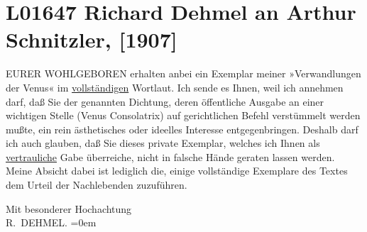 

\section[Richard Dehmel an Arthur Schnitzler, {[}1907{]}]{L01647 Richard Dehmel an Arthur Schnitzler, {[}1907{]}}
\nopagebreak{}
\rehead{ }\normalsize\beginnumbering{}
\toendnotes[C]{\smallbreak\pagebreak[2]}
\toendnotes[C]{\smallbreak}
\pstart\center{}{\pb}EURER WOHLGEBOREN\pend\vspace{0.5em}
\pstart
           erhalten anbei ein Exemplar meiner »Verwandlungen der
                  Venus« im \uline{vollständigen} Wortlaut. Ich sende
               es Ihnen, weil ich annehmen darf, daß Sie der genannten Dichtung, deren öffentliche
               Ausgabe an einer wichtigen Stelle (Venus Consolatrix) auf gerichtlichen Befehl
               verstümmelt werden mußte, ein rein ästhetisches oder ideelles Interesse
               entgegenbringen. Deshalb darf ich auch glauben, daß Sie dieses private Exemplar,
               welches ich Ihnen als \uline{vertrauliche} Gabe überreiche,
               nicht in falsche Hände geraten lassen werden. Meine Absicht dabei ist lediglich die,
               einige vollständige Exemplare des Textes dem Urteil der Nachlebenden zuzuführen.\pend
           
\pstart
           Mit besonderer Hochachtung{\\[\baselineskip]}\spacefill\mbox{R. DEHMEL.}\pend
           \leftskip=0em{}\endnumbering{}  \newcommand{\dateiname}{L01647}\newcommand{\titel}{Richard Dehmel an Arthur Schnitzler, [1907]}\newcommand{\editorInnen}{Martin Anton Müller und Gerd-Hermann Susen}
